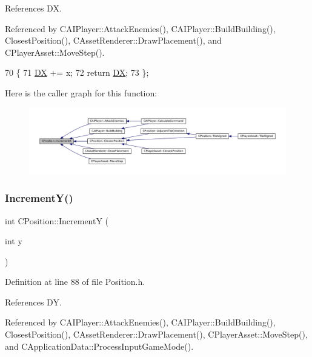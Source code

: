 References DX.



Referenced by C\+A\+I\+Player\+::\+Attack\+Enemies(), C\+A\+I\+Player\+::\+Build\+Building(), Closest\+Position(), C\+Asset\+Renderer\+::\+Draw\+Placement(), and C\+Player\+Asset\+::\+Move\+Step().


\begin{DoxyCode}
70                              \{
71             \hyperlink{classCPosition_a28445f9b872169715919074d82044eda}{DX} += x; 
72             \textcolor{keywordflow}{return} \hyperlink{classCPosition_a28445f9b872169715919074d82044eda}{DX};
73         \};
\end{DoxyCode}
Here is the caller graph for this function\+:
\nopagebreak
\begin{figure}[H]
\begin{center}
\leavevmode
\includegraphics[width=350pt]{classCPosition_aa5955d67d5ab7ca74d80cb7303b6eaa9_icgraph}
\end{center}
\end{figure}
\hypertarget{classCPosition_a3f2a26798bb27b1252ff1be303b3adfc}{}\label{classCPosition_a3f2a26798bb27b1252ff1be303b3adfc} 
\subsubsection{\texorpdfstring{Increment\+Y()}{IncrementY()}}
{\footnotesize\ttfamily int C\+Position\+::\+IncrementY (\begin{DoxyParamCaption}\item[{int}]{y }\end{DoxyParamCaption})\hspace{0.3cm}{\ttfamily [inline]}}



Definition at line 88 of file Position.\+h.



References DY.



Referenced by C\+A\+I\+Player\+::\+Attack\+Enemies(), C\+A\+I\+Player\+::\+Build\+Building(), Closest\+Position(), C\+Asset\+Renderer\+::\+Draw\+Placement(), C\+Player\+Asset\+::\+Move\+Step(), and C\+Application\+Data\+::\+Process\+Input\+Game\+Mode().


